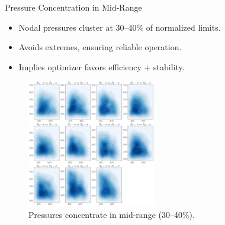 \documentclass[hyperref={colorlinks,citecolor=blue,linkcolor=blue,urlcolor=blue}]{beamer}
\begin{document}
\begin{frame}{Pressure Concentration in Mid-Range}
\scriptsize
    \begin{itemize}
        \item Nodal pressures cluster at 30--40\% of normalized limits.
        \item Avoids extremes, ensuring reliable operation.
        \item Implies optimizer favors efficiency + stability.
    \end{itemize}
    \begin{figure}
        \includegraphics[width=0.5\textwidth]{figures/outputs_outputs_3.png}
        \caption{\scriptsize Pressures concentrate in mid-range (30--40\%).}
    \end{figure}
\end{frame}
\end{document}
